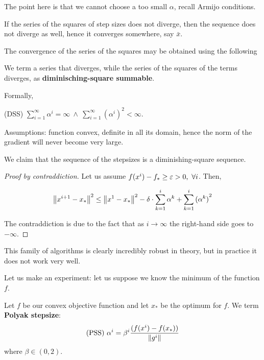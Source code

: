 \documentclass[ComputationalMathematics.tex]{subfiles}
\begin{document}
The point here is that we cannot choose a too small $\alpha$, recall Armijo conditions.

If the series of the squares of step sizes does not diverge, then the sequence does not diverge as well, hence it converges somewhere, say $\bar{x}$.

The convergence of the series of the squares may be obtained using the following 

\begin{definition}
  We term a series that diverges, while the series of the squares of the terms diverges, as \textbf{diminisching-square summable}.
  
  Formally,
  
  (DSS) $\sum\limits_{i=1}^\infty \alpha^i = \infty~\wedge~\sum\limits_{i=1}^\infty {(\alpha^i)}^2 < \infty$.
\end{definition}

Assumptions: function convex, definite in all its domain, hence the norm of the gradient will never become very large.

\begin{proposition}
We claim that the sequence of the stepsizes is a diminishing-square sequence.
\end{proposition}

\begin{proof}[Proof by contraddiction]
Let us assume $f(x^i) - f_* \ge \varepsilon > 0,~\forall i$. Then,

  \[
    {\left\lVert x^{i+1} - x_*\right\rVert}^2 \le {\left\lVert x^1 -x_*\right\rVert}^2 - \delta \cdot \sum\limits_{k=1}^{i} \alpha^k + \sum\limits_{k=1}^{i} {(\alpha^k)}^2
  \]

The contraddiction is due to the fact that as $i \to \infty$ the right-hand side goes to $- \infty$.
\end{proof}

This family of algorithms is clearly incredibly robust in theory, but in practice it does not work very well.

Let us make an experiment: let us suppose we know the minimum of the function $f$. 

\begin{definition}
Let $f$ be our convex objective function and let $x_*$ be the optimum for $f$.
  We term \textbf{Polyak stepsize}:
  \[
    \text{(PSS)}~\alpha^i = \beta^i \frac{(f(x^i) - f(x_*))}{\left\lVert g^i\right\rVert}
  \]
  where $\beta \in (0, 2)$.

 \end{definition}
 
\end{document}

